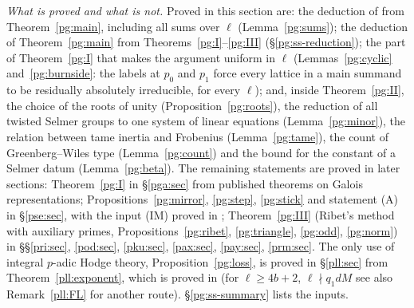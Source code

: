 \documentclass[10pt]{amsart}
\theoremstyle{definition}
\theoremstyle{remark}
\begin{document}
\emph{What is proved and what is not.} Proved in this section are: the deduction of
{\cite[Proposition~14.40]{P46}} from Theorem~\ref{pg:main}, including all sums over $\ell$
(Lemma~\ref{pg:sums}); the deduction of Theorem~\ref{pg:main} from Theorems~\ref{pg:I}--\ref{pg:III}
(\S\ref{pg:ss-reduction}); the part of Theorem~\ref{pg:I} that makes the argument uniform in $\ell$
(Lemmas~\ref{pg:cyclic} and~\ref{pg:burnside}: the labels at $p_0$ and $p_1$ force every lattice in
a main summand to be residually absolutely irreducible, for every $\ell$); and, inside
Theorem~\ref{pg:II}, the choice of the roots of unity (Proposition~\ref{pg:roots}), the reduction of
all twisted Selmer groups to one system of linear equations (Lemma~\ref{pg:minor}), the relation
between tame inertia and Frobenius (Lemma~\ref{pg:tame}), the count of Greenberg--Wiles type
(Lemma~\ref{pg:count}) and the bound for the constant of a Selmer datum (Lemma~\ref{pg:beta}). The
remaining statements are proved in later sections: Theorem~\ref{pg:I} in \S\ref{pga:sec} from
published theorems on Galois representations; Propositions~\ref{pg:mirror}, \ref{pg:step},
\ref{pg:stick} and statement (A) in \S\ref{pse:sec}, with the input (IM) proved in {\cite[\S3.1]{P54}};
Theorem~\ref{pg:III} (Ribet's method with auxiliary primes, Propositions~\ref{pg:ribet},
\ref{pg:triangle}, \ref{pg:odd}, \ref{pg:norm}) in \S\S\ref{pri:sec}, \ref{pod:sec}, \ref{pku:sec},
\ref{pax:sec}, \ref{pay:sec}, \ref{prm:sec}. The only use of integral $p$-adic Hodge theory,
Proposition~\ref{pg:loss}, is proved in \S\ref{pll:sec} from Theorem~\ref{pll:exponent}, which is
proved in {\cite[\S2.3]{P56}} (for $\ell\ge4b+2$, $\ell\nmid q_1dM$ see also
Remark~\ref{pll:FL} for another route). \S\ref{pg:ss-summary}
lists the inputs.
\end{document}
